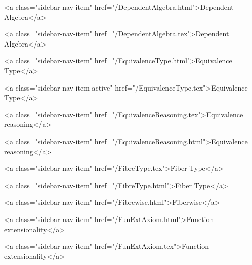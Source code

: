       
    
      
        
          <a class="sidebar-nav-item" href="/DependentAlgebra.html">Dependent Algebra</a>
        
      
    
      
        
          <a class="sidebar-nav-item" href="/DependentAlgebra.tex">Dependent Algebra</a>
        
      
    
      
        
          <a class="sidebar-nav-item" href="/EquivalenceType.html">Equivalence Type</a>
        
      
    
      
        
          <a class="sidebar-nav-item active" href="/EquivalenceType.tex">Equivalence Type</a>
        
      
    
      
        
          <a class="sidebar-nav-item" href="/EquivalenceReasoning.tex">Equivalence reasoning</a>
        
      
    
      
        
          <a class="sidebar-nav-item" href="/EquivalenceReasoning.html">Equivalence reasoning</a>
        
      
    
      
        
          <a class="sidebar-nav-item" href="/FibreType.tex">Fiber Type</a>
        
      
    
      
        
          <a class="sidebar-nav-item" href="/FibreType.html">Fiber Type</a>
        
      
    
      
        
          <a class="sidebar-nav-item" href="/Fibrewise.html">Fiberwise</a>
        
      
    
      
        
          <a class="sidebar-nav-item" href="/FunExtAxiom.html">Function extensionality</a>
        
      
    
      
        
          <a class="sidebar-nav-item" href="/FunExtAxiom.tex">Function extensionality</a>
        
